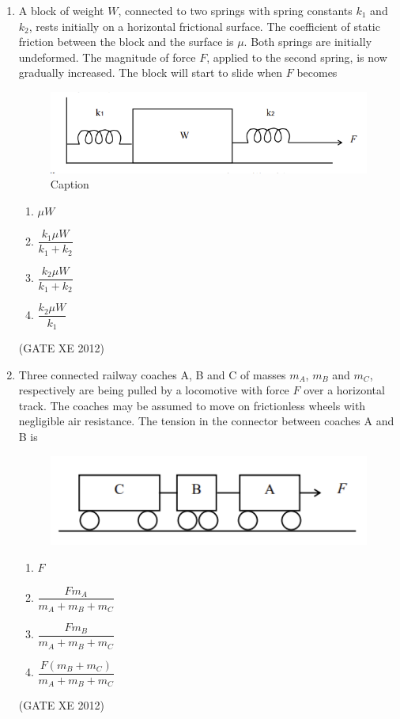 \documentclass[12pt]{article}
\begin{document}
\begin{enumerate}
\item A block of weight $W$, connected to two springs with spring constants $k_1$ and $k_2$, rests initially on a horizontal frictional surface. The coefficient of static friction between the block and the surface is $\mu$. Both springs are initially undeformed. The magnitude of force $F$, applied to the second spring, is now gradually increased. The block will start to slide when $F$ becomes

\begin{figure}[H]
    \centering
    \includegraphics[width=0.5\columnwidth]{figs/ass2_d_q2.png}
    \caption{Caption}
    \label{fig:placeholder}
\end{figure}

\begin{multicols}{2}
\begin{enumerate}
\item $\mu W$
\item $\dfrac{k_1 \mu W}{k_1 + k_2}$
\item $\dfrac{k_2 \mu W}{k_1 + k_2}$
\item $\dfrac{k_2 \mu W}{k_1}$
\end{enumerate}
\end{multicols}
(GATE XE 2012)

\item Three connected railway coaches A, B and C of masses $m_A$, $m_B$ and $m_C$, respectively are being 
pulled by a locomotive with force $F$ over a horizontal track. The coaches may be assumed to move on frictionless wheels with negligible air resistance. The tension in the connector between coaches A and B is  

\begin{figure}[H]
    \centering
    \includegraphics[width=0.5\columnwidth]{figs/ass2_d_q3.png}
    \caption{}
    \label{fig:placeholder}
\end{figure}

\begin{multicols}{2}
\begin{enumerate}
    \item $F$
    \item $\dfrac{F m_A}{m_A+m_B+m_C}$
    \item $\dfrac{F m_B}{m_A+m_B+m_C}$
    \item $\dfrac{F(m_B+m_C)}{m_A+m_B+m_C}$
\end{enumerate}
\end{multicols}
(GATE XE 2012)



\end{enumerate}
\end{document}
